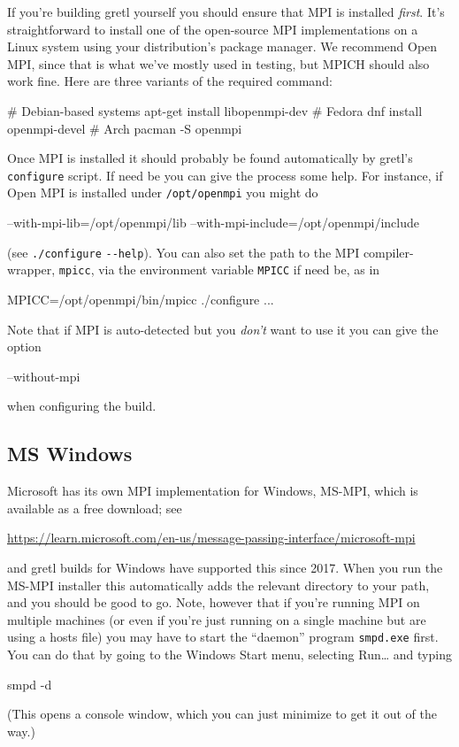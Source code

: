\documentclass{article}
\begin{document}
If you're building gretl yourself you should ensure that MPI is
installed \textit{first}.  It's straightforward to install one of the
open-source MPI implementations on a Linux system using your
distribution's package manager. We recommend \textsf{Open MPI}, since
that is what we've mostly used in testing, but \textsf{MPICH} should
also work fine.  Here are three variants of the required command:
\begin{code}
# Debian-based systems
apt-get install libopenmpi-dev
# Fedora
dnf install openmpi-devel
# Arch
pacman -S openmpi
\end{code}

Once MPI is installed it should probably be found automatically by
gretl's \texttt{configure} script. If need be you can give the process
some help. For instance, if \textsf{Open MPI} is installed under
\texttt{/opt/openmpi} you might do
\begin{code}
--with-mpi-lib=/opt/openmpi/lib
--with-mpi-include=/opt/openmpi/include
\end{code}
(see \texttt{./configure} \verb|--help|). You can also set the path
to the MPI compiler-wrapper, \texttt{mpicc}, via the environment
variable \texttt{MPICC} if need be, as in
\begin{code}
MPICC=/opt/openmpi/bin/mpicc ./configure ...
\end{code}

Note that if MPI is auto-detected but you \emph{don't} want to use it
you can give the option
\begin{code}
--without-mpi
\end{code}
when configuring the build.

\subsection{MS Windows}

Microsoft has its own MPI implementation for Windows, \textsf{MS-MPI},
which is available as a free download; see

\url{https://learn.microsoft.com/en-us/message-passing-interface/microsoft-mpi}

and gretl builds for Windows have supported this since 2017. When you
run the \textsf{MS-MPI} installer this automatically adds the relevant
directory to your path, and you should be good to go.  Note, however
that if you're running MPI on multiple machines (or even if you're just
running on a single machine but are using a hosts file) you may have to
start the ``daemon'' program \texttt{smpd.exe} first. You can do that by
going to the Windows Start menu, selecting \textsf{Run\dots{}} and
typing
\begin{code}
smpd -d
\end{code}
(This opens a console window, which you can just minimize to get it
out of the way.)
\end{document}
